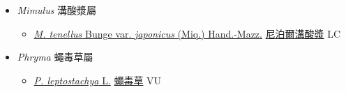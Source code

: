 
  \begin{itemize}
 \item[] \textit{Mimulus} 溝酸漿屬
                    
  \begin{itemize}
        \item[] \href{http://www.theplantlist.org/tpl1.1/search?q=Mimulus+tenellus+var.+japonicus}{\textit{M. tenellus} Bunge var. \textit{japonicus} (Miq.) Hand.-Mazz.}   \href{\detokenize{http://taibnet.sinica.edu.tw/chi/taibnet_species_list.php?T2=尼泊爾溝酸漿&T2_new_value=true&fr=y}}{尼泊爾溝酸漿} LC
  \end{itemize}
 \item[] \textit{Phryma} 蠅毒草屬
                    
  \begin{itemize}
        \item[] \href{http://www.theplantlist.org/tpl1.1/search?q=Phryma+leptostachya}{\textit{P. leptostachya} L.}   \href{\detokenize{http://taibnet.sinica.edu.tw/chi/taibnet_species_list.php?T2=蠅毒草&T2_new_value=true&fr=y}}{蠅毒草} VU
  \end{itemize}
  \end{itemize}
